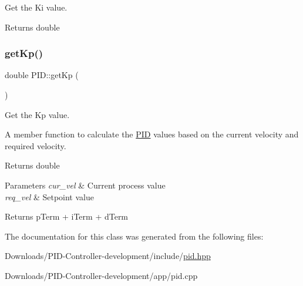 Get the Ki value. 

\begin{DoxyReturn}{Returns}
double 
\end{DoxyReturn}
\mbox{\label{classPID_a52625de61b1b2977b2c26ddb2698f14e}} 
\subsubsection{\texorpdfstring{get\+Kp()}{getKp()}}
{\footnotesize\ttfamily double P\+I\+D\+::get\+Kp (\begin{DoxyParamCaption}{ }\end{DoxyParamCaption})}



Get the Kp value. 

A member function to calculate the \hyperlink{classPID}{P\+ID} values based on the current velocity and required velocity.

\begin{DoxyReturn}{Returns}
double
\end{DoxyReturn}

\begin{DoxyParams}{Parameters}
{\em cur\+\_\+vel} & Current process value \\
\hline
{\em req\+\_\+vel} & Setpoint value \\
\hline
\end{DoxyParams}
\begin{DoxyReturn}{Returns}
p\+Term + i\+Term + d\+Term 
\end{DoxyReturn}


The documentation for this class was generated from the following files\+:\begin{DoxyCompactItemize}
\item 
Downloads/\+P\+I\+D-\/\+Controller-\/development/include/\hyperlink{pid_8hpp}{pid.\+hpp}\item 
Downloads/\+P\+I\+D-\/\+Controller-\/development/app/pid.\+cpp\end{DoxyCompactItemize}
